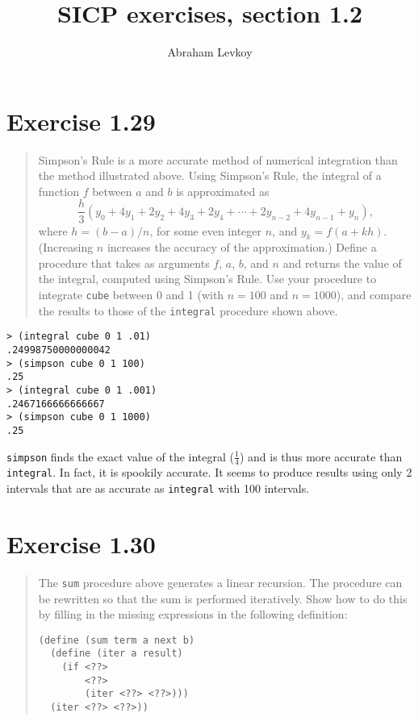 \documentclass{article}
\author{Abraham Levkoy}
\title{SICP exercises, section 1.2}
\begin{document}
\maketitle

\section{Exercise 1.29}
\begin{quote}
    Simpson's Rule is a more accurate method of numerical integration than the
    method illustrated above. Using Simpson's Rule, the integral of a function
    $f$ between $a$ and $b$ is approximated as
    \begin{equation*}
        \frac{h}{3}(y_0+4y_1+2y_2+4y_3+2y_4+\cdots+2y_{n-2}+4y_{n-1}+y_n),
    \end{equation*}
    where $h=(b−a)/n$, for some even integer $n$, and $y_k=f(a+kh)$.
    (Increasing $n$ increases the accuracy of the approximation.) Define a
    procedure that takes as arguments $f$, $a$, $b$, and $n$ and returns the
    value of the integral, computed using Simpson’s Rule. Use your procedure to
    integrate \texttt{cube} between 0 and 1 (with $n=100$ and $n=1000$), and
    compare the results to those of the \texttt{integral} procedure shown
    above.
\end{quote}



\begin{lstlisting}
> (integral cube 0 1 .01)
.24998750000000042
> (simpson cube 0 1 100)
.25
> (integral cube 0 1 .001)
.2467166666666667
> (simpson cube 0 1 1000)
.25
\end{lstlisting}

\texttt{simpson} finds the exact value of the integral ($\frac{1}{4}$) and is
thus more accurate than \texttt{integral}. In fact, it is spookily accurate. It
seems to produce results using only 2 intervals that are as accurate as
\texttt{integral} with 100 intervals.

\section{Exercise 1.30}
\begin{quote}
    The \texttt{sum} procedure above generates a linear recursion. The
    procedure can be rewritten so that the sum is performed iteratively. Show
    how to do this by filling in the missing expressions in the following
    definition:
    \begin{lstlisting}
(define (sum term a next b)
  (define (iter a result)
    (if <??>
        <??>
        (iter <??> <??>)))
  (iter <??> <??>))
    \end{lstlisting}
\end{quote}
\end{document}
